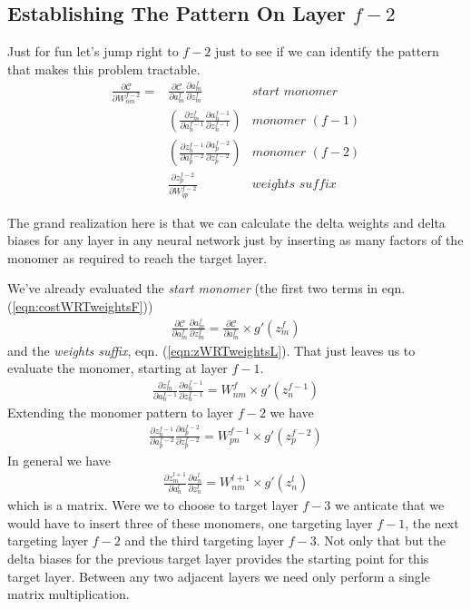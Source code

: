 \documentclass[twocolumn]{revtex4-1}
\newcommand{\cC}{\mathscr{C}}
\newcommand{\parpar}[2]{\frac{\partial #1}{\partial #2}}
\begin{document}
\subsection{Establishing The Pattern On Layer $f-2$}
Just for fun let's jump right to $f-2$ just to see if we can identify the pattern that makes this problem tractable.
\begin{align}
    \parpar{\cC}{W^{f-2}_{n m}} = & \parpar{\cC}{a^f_m} \parpar{a^f_m}{z^f_m} & \textit{start monomer} \nonumber \\
        & \left(\parpar{z^f_m}{a^{f-1}_n} \parpar{a^{f-1}_n}{z^{f-1}_n} \right) & \textit{monomer $(f-1)$} \nonumber \\
        & \left(\parpar{z^{f-1}_n}{a^{f-2}_p} \parpar{a^{f-2}_p}{z^{f-2}_p} \right) & \textit{monomer $(f-2)$} \nonumber \\
        & \parpar{z^{f-2}_p}{W^{f-2}_{q p}} & \textit{weights suffix}
\end{align}

The grand realization here is that we can calculate the delta weights and delta biases for any layer in any neural network just by inserting as many factors of the monomer as required to reach the target layer.

We've already evaluated the \textit{start monomer} (the first two terms in eqn. (\ref{eqn:costWRTweightsF}))
\begin{align}
    \label{eqn:startMonomer}
    \parpar{\cC}{a^f_m} \parpar{a^f_m}{z^f_m} = \parpar{\cC}{a^f_m} \times g'(z^f_m)
\end{align}
and the \textit{weights suffix}, eqn. (\ref{eqn:zWRTweightsL}). That just leaves us to evaluate the monomer, starting at layer $f-1$.
\begin{align}
    \label{eqn:monomerAtFm1}
    \parpar{z^f_m}{a^{f-1}_n} \parpar{a^{f-1}_n}{z^{f-1}_n} = W^f_{n m} \times g'(z^{f-1}_n)
\end{align}
Extending the monomer pattern to layer $f-2$ we have
\begin{align}
    \label{eqn:monomerAtFm2}
    \parpar{z^{f-1}_n}{a^{f-2}_p} \parpar{a^{f-2}_p}{z^{f-2}_p} = W^{f-1}_{p n} \times g'(z^{f-2}_p)
\end{align}
In general we have 
\begin{align}
    \label{eqn:monomerForTargetL}
    \parpar{z^{l+1}_m}{a^l_n} \parpar{a^l_n}{z^l_n} = W^{l+1}_{n m} \times g'(z^l_n)
\end{align}
which is a matrix. Were we to choose to target layer $f-3$ we anticate that we would have to insert three of these monomers, one targeting layer $f-1$, the next targeting layer $f-2$ and the third targeting layer $f-3$. Not only that but the delta biases for the previous target layer provides the starting point for this target layer. Between any two adjacent layers we need only perform a single matrix multiplication.
\end{document}
